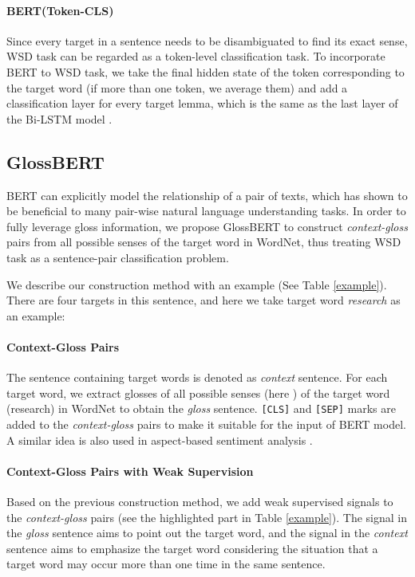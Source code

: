 \documentclass[11pt,a4paper]{article}
\begin{document}
\paragraph{BERT(Token-CLS)}
Since every target in a sentence needs to be disambiguated to find its exact sense, WSD task can be regarded as a token-level classification task. To incorporate BERT to WSD task, we take the final hidden state of the token corresponding to the target word (if more than one token, we average them) and add a classification layer for every target lemma, which is the same as the last layer of the Bi-LSTM model \citep{kaageback2016word}.









\subsection{GlossBERT}
BERT can explicitly model the relationship of a pair of texts, which
has shown to be beneficial to many pair-wise natural language understanding tasks. In order to fully leverage gloss information, we propose GlossBERT to construct \textit{context-gloss} pairs from all possible senses of the target word in WordNet, thus treating WSD task as a sentence-pair classification problem.



We describe our construction method with an example (See Table \ref{example}). There are four targets in this sentence, and here we take target word \textit{research} as an example:

\paragraph{Context-Gloss Pairs}
The sentence containing target words is denoted as \textit{context} sentence. For each target word, we extract glosses of all  possible senses (here ) of the target word (research) in WordNet to obtain the \textit{gloss} sentence. \texttt{[CLS]} and \texttt{[SEP]} marks are added to the \textit{context-gloss} pairs to make it suitable for the input of BERT model. A similar idea is also used in aspect-based sentiment analysis \cite{sun2019utilizing}.

\paragraph{Context-Gloss Pairs with Weak Supervision}
Based on the previous construction method, we add weak supervised signals to the \textit{context-gloss} pairs (see the highlighted part in Table \ref{example}). The signal in the \textit{gloss} sentence aims to point out the target word, and the signal in the \textit{context} sentence aims to emphasize the target word considering the situation that a target word may occur more than one time in the same sentence.
\end{document}
